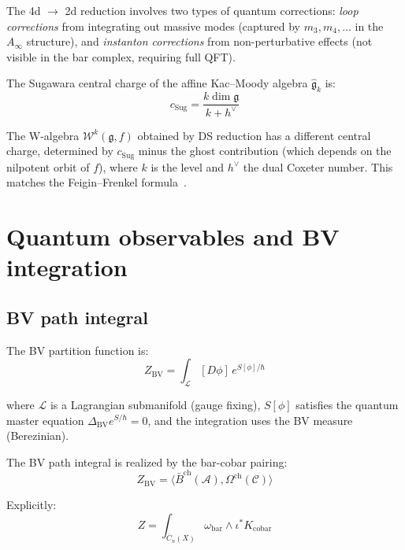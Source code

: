 \begin{remark}
The 4d $\to$ 2d reduction involves two types of quantum corrections: \emph{loop corrections} from integrating out massive modes (captured by $m_3, m_4, \ldots$ in the $A_\infty$ structure), and \emph{instanton corrections} from non-perturbative effects (not visible in the bar complex, requiring full QFT).
\end{remark}

\begin{theorem}
\label{thm:central-charge-from-4d}
The Sugawara central charge of the affine Kac--Moody algebra $\widehat{\mathfrak{g}}_k$ is:
\[c_{\mathrm{Sug}} = \frac{k \dim \mathfrak{g}}{k + h^\vee}\]

The W-algebra $\mathcal{W}^k(\mathfrak{g}, f)$ obtained by DS reduction has a different central charge, determined by $c_{\mathrm{Sug}}$ minus the ghost contribution (which depends on the nilpotent orbit of $f$), where $k$ is the level and $h^\vee$ the dual Coxeter number.  This matches the Feigin--Frenkel formula~\cite{Feigin-Frenkel}.
\end{theorem}

\section{Quantum observables and BV integration}

\subsection{BV path integral}

\begin{definition}
The BV partition function is:
\[Z_{\text{BV}} = \int_{\mathcal{L}} [D\phi] \, e^{S[\phi]/\hbar}\]

where $\mathcal{L}$ is a Lagrangian submanifold (gauge fixing), $S[\phi]$ satisfies the quantum master equation $\Delta_{\text{BV}} e^{S/\hbar} = 0$, and the integration uses the BV measure (Berezinian).
\end{definition}

\begin{conjecture}[BV integration = bar-cobar pairing; \ClaimStatusHeuristic]
\label{conj:bv-integration-bar-cobar}
The BV path integral is realized by the bar-cobar pairing:
\[Z_{\text{BV}} = \langle \bar{B}^{\text{ch}}(\mathcal{A}), 
\Omega^{\text{ch}}(\mathcal{C}) \rangle\]

Explicitly:
\[Z = \int_{\overline{C}_n(X)} \omega_{\text{bar}} \wedge \iota^* K_{\text{cobar}}\]
\end{conjecture}

